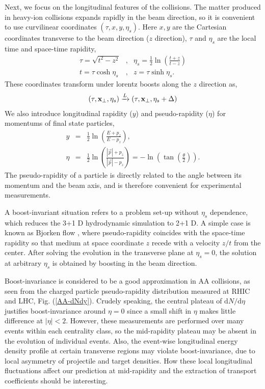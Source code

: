 \documentclass[aps,prl,twocolumn,groupedaddress]{revtex4-1}
\begin{document}
	Next, we focus on the longitudinal features of the collisions.
	The matter produced in heavy-ion collisions expands rapidly in the beam direction, so it is convenient to use curvilinear coordinates $(\tau, x, y, \eta_s)$. 
	Here $x, y$ are the Cartesian coordinates transverse to the beam direction ($z$ direction), $\tau$ and $\eta_s$ are the local time and space-time rapidity,
	\begin{eqnarray}
		\tau = \sqrt{t^2 - z^2} &,& \eta_s = \frac{1}{2}\ln\left(\frac{t+z}{t-z}\right) \\
		t = \tau \cosh \eta_s &,& z = \tau \sinh \eta_s.
	\end{eqnarray}
	These coordinates transform under lorentz boosts along the $z$ direction as,
	\begin{eqnarray}
		(\tau, {\bf x_{\perp}}, \eta_s) \xrightarrow{L} (\tau, {\bf x_{\perp}}, \eta_s + \Delta)
	\end{eqnarray}
	We also introduce longitudinal rapidity ($y$) and pseudo-rapidity ($\eta$) for momentums of final state particles,
	\begin{eqnarray}
	y &=& \frac{1}{2}\ln\left( \frac{E + p_z}{E - p_z} \right), \\
	\eta &=& \frac{1}{2}\ln\left( \frac{|\vec{p}|+p_z}{|\vec{p}|-p_z} \right) = -\ln\left(\tan\left(\frac{\theta}{2}\right)\right).
	\end{eqnarray}
	The pseudo-rapidity of a particle is directly related to the angle between its momentum and the beam axis, and is therefore convenient for experimental measurements.
	
	A boost-invariant situation refers to a problem set-up without $\eta_s$ dependence, which reduces the 3+1 D hydrodynamic simulation to 2+1 D. 
	A simple case is known as Bjorken flow \citep{Bjorken:1982qr}, where pseudo-rapidity coincides with the space-time rapidity so that medium at space coordinate $z$ recede with a velocity $z/t$ from the center.
	After solving the evolution in the transverse plane at $\eta_s = 0$, the solution at arbitrary $\eta_s$ is obtained by boosting in the beam direction.
	
	Boost-invariance is considered to be a good approximation in AA collisions, as seen from the charged particle pseudo-rapidity distribution measured at RHIC and LHC, Fig. (\ref{AA-dNdy}). 
	Crudely speaking, the central plateau of $\mathrm{d}N/\mathrm{d}\eta$ justifies boost-invariance around $\eta = 0$ since a small shift in $\eta$ makes little difference at $|\eta| < 2$. 
	However, these measurements are performed over many events within each centrality class, so the mid-rapidity plateau may be absent in the evolution of individual events.
	Also, the event-wise longitudinal energy density profile at certain transverse regions may violate boost-invariance, due to local asymmetry of projectile and target densities. 
	How these local longitudinal fluctuations affect our prediction at mid-rapidity and the extraction of transport coefficients should be interesting.
	
\end{document}
